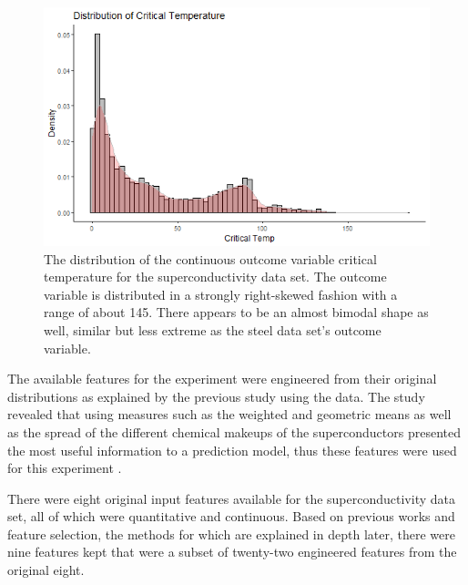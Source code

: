 \documentclass[10pt]{article}\usepackage[]{graphicx}\usepackage[]{xcolor}
\begin{document}
\begin{figure}[htp]
  \centering
  \includegraphics[scale=0.8]{EDA/conduct_response_dist.png}
  \caption{The distribution of the continuous outcome variable critical temperature for the superconductivity data set. The outcome variable is distributed in a strongly right-skewed fashion with a range of about 145. There appears to be an almost bimodal shape as well, similar but less extreme as the steel data set's outcome variable.}
  \label{img:conduct_dist}
\end{figure}

\newpage

The available features for the experiment were engineered from their original distributions as explained by the previous study using the data. The study revealed that using measures such as the weighted and geometric means as well as the spread of the different chemical makeups of the superconductors presented the most useful information to a prediction model, thus these features were used for this experiment \cite{RelatedWork:Conduct}.

There were eight original input features available for the superconductivity data set, all of which were quantitative and continuous. Based on previous works and feature selection, the methods for which are explained in depth later, there were nine features kept that were a subset of twenty-two engineered features from the original eight. \\
\end{document}
